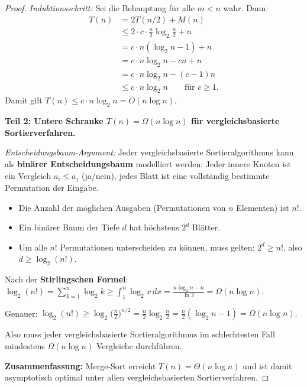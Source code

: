 ﻿\documentclass[a4paper,12pt]{report}
\theoremstyle{definition}
\begin{document}
\begin{proof}
    \emph{Induktionsschritt:} Sei die Behauptung für alle $m < n$ wahr.
    Dann:
    \begin{align*}
        T(n) &= 2T(n/2) + M(n) \\
             &\leq 2 \cdot c \cdot \tfrac{n}{2} \log_2 \tfrac{n}{2} + n \\
             &= c \cdot n (\log_2 n - 1) + n \\
             &= c \cdot n \log_2 n - cn + n \\
             &= c \cdot n \log_2 n - (c-1)n \\
             &\leq c \cdot n \log_2 n \qquad \text{für } c \geq 1.
    \end{align*}
    Damit gilt $T(n) \leq c \cdot n \log_2 n = O(n \log n)$.

    \textbf{Teil 2: Untere Schranke $T(n) = \Omega(n \log n)$
    für vergleichsbasierte Sortierverfahren.}

    \emph{Entscheidungsbaum-Argument:}
    Jeder vergleichsbasierte Sortieralgorithmus kann als
    \textbf{binärer Entscheidungsbaum} modelliert werden:
    Jeder innere Knoten ist ein Vergleich $a_i \leq a_j$ (ja/nein),
    jedes Blatt ist eine vollständig bestimmte Permutation der Eingabe.

    \begin{itemize}
        \item[-] Die Anzahl der möglichen Ausgaben (Permutationen
              von $n$ Elementen) ist $n!$.
        \item[-] Ein binärer Baum der Tiefe $d$ hat höchstens $2^d$ Blätter.
        \item[-] Um alle $n!$ Permutationen unterscheiden zu können,
              muss gelten: $2^d \geq n!$, also $d \geq \log_2(n!)$.
    \end{itemize}

    Nach der \textbf{Stirlingschen Formel}:
    $\log_2(n!) = \sum_{k=1}^n \log_2 k \geq \int_1^n \log_2 x\, dx
    = \frac{n \log_2 n - n}{\ln 2} = \Omega(n \log n)$.

    Genauer: $\log_2(n!) \geq \log_2\bigl(\frac{n}{2}\bigr)^{n/2}
    = \frac{n}{2} \log_2 \frac{n}{2} = \frac{n}{2}(\log_2 n - 1)
    = \Omega(n \log n)$.

    Also muss jeder vergleichsbasierte Sortieralgorithmus im
    schlechtesten Fall mindestens $\Omega(n \log n)$ Vergleiche
    durchführen.

    \textbf{Zusammenfassung:} Merge-Sort erreicht $T(n) = \Theta(n \log n)$
    und ist damit asymptotisch optimal unter allen
    vergleichsbasierten Sortierverfahren.
\end{proof}
\end{document}
